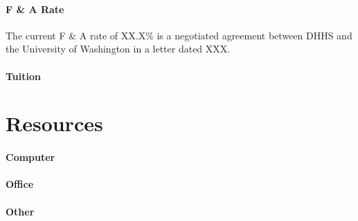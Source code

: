 \documentclass[12pt]{article}
\newcommand{\instructions}[1]{}
\begin{document}
\paragraph{F \& A Rate}
The current F \& A rate of XX.X\% is a negotiated agreement between DHHS and the University of Washington in a letter dated XXX.

\paragraph{Tuition}

\clearpage
\section*{Resources}

\instructions{ Instructions: This information is used to assess the
    capability of the organizational resources available to perform
    the effort proposed.  Identify the facilities to be used
    (laboratory, clinical, animal, computer, office, other). If
    appropriate, indicate their capacities, pertinent capabilities,
    relative proximity and extent of availability to the
    project. Describe only those resources that are directly
    applicable to the proposed work. Provide any information
    describing the Other Resources available to the project (e.g.,
    machine shop, electronic shop) and the extent to which they would
    be available to the project.  Describe how the scientific
    environment in which the research will be done contributes to the
    probability of success (e.g., institutional support, physical
    resources, and intellectual rapport). In describing the scientific
    environment in which the work will be done, discuss ways in which
    the proposed studies will benefit from unique features of the
    scientific environment or subject populations or will employ
    useful collaborative arrangements.}

\instructions{ Review criteria: Will the scientific environment in
    which the work will be done contribute to the probability of
    success? Are the institutional support, equipment and other
    physical resources available to the investigators adequate for the
    project proposed? Will the project benefit from unique features of
    the scientific environment, subject populations, or collaborative
    arrangements?}

\paragraph{Computer}

\paragraph{Office}

\paragraph{Other}
\end{document}
